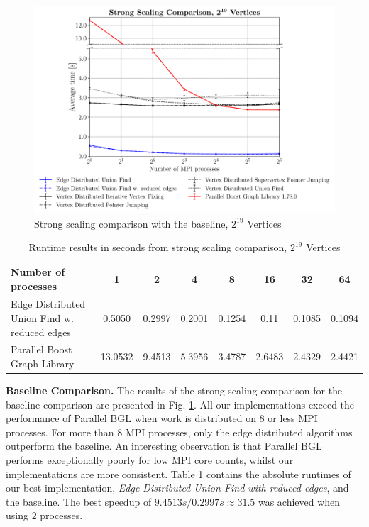 \documentclass[letterpaper]{article}
\newcommand{\mypar}[1]{{\bf #1.}}
\begin{document}
\begin{figure}
  \includegraphics[width=\columnwidth]{../benchmark-results/plots/strongscaling_s19.pdf}
  \caption{Strong scaling comparison with the baseline, $2^{19}$ Vertices}
  \label{fig:strongscaling-19}
\end{figure}

\begin{table}
  \begin{tabularx}{\linewidth}{ l | c  c  c  c  c  c  c }
    \toprule
    \textbf{Number of processes} & \textbf{1} & \textbf{2} & \textbf{4} & \textbf{8} & \textbf{16} & \textbf{32} &
      \textbf{64} \\ \midrule
    Edge Distributed Union Find w. reduced edges & 0.5050 & 0.2997 & 0.2001 & 0.1254 & 0.11 & 0.1085 & 0.1094 \\
    Parallel Boost Graph Library & 13.0532 & 9.4513 & 5.3956 & 3.4787 & 2.6483 & 2.4329 & 2.4421 \\ \bottomrule
  \end{tabularx}
  \caption{Runtime results in seconds from strong scaling comparison, $2^{19}$ Vertices}
  \label{tab:strongscaling-19-table}
\end{table}

\mypar{Baseline Comparison}
The results of the strong scaling comparison for the baseline comparison are presented in Fig. \ref{fig:strongscaling-19}.
All our implementations exceed the performance of Parallel BGL when work is distributed on $8$ or
less MPI processes. For more than $8$ MPI processes, only the edge distributed algorithms outperform the baseline. An
interesting observation is that Parallel BGL performs exceptionally poorly for low MPI core counts, whilst our
implementations are more consistent. Table \ref{tab:strongscaling-19-table} contains the absolute runtimes of our
best implementation, \emph{Edge Distributed Union Find with reduced edges}, and the baseline. The best speedup of
$9.4513s/0.2997s \approx 31.5$ was achieved when using $2$ processes.
\end{document}
